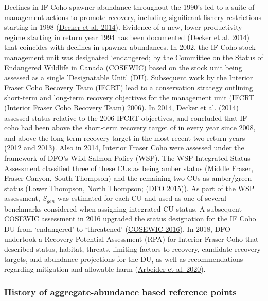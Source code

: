 \documentclass[11pt]{book}
\begin{document}
Declines in IF Coho spawner abundance throughout the 1990's led to a suite of management actions to promote recovery, including significant fishery restrictions starting in 1998 (\protect\hyperlink{ref-deckerAssessmentInteriorFraser2014}{Decker et al. 2014}). Evidence of a new, lower productivity regime starting in return year 1994 has been documented (\protect\hyperlink{ref-deckerAssessmentInteriorFraser2014}{Decker et al. 2014}) that coincides with declines in spawner abundances. In 2002, the IF Coho stock management unit was designated `endangered; by the Committee on the Status of Endangered Wildlife in Canada (COSEWIC) based on the stock unit being assessed as a single 'Designatable Unit' (DU). Subsequent work by the Interior Fraser Coho Recovery Team (IFCRT) lead to a conservation strategy outlining short-term and long-term recovery objectives for the management unit (\protect\hyperlink{ref-ifcrtinteriorfrasercohorecoveryteamConservationStrategyCoho2006}{IFCRT (Interior Fraser Coho Recovery Team) 2006}). In 2014, \protect\hyperlink{ref-deckerAssessmentInteriorFraser2014}{Decker et al.} (\protect\hyperlink{ref-deckerAssessmentInteriorFraser2014}{2014}) assessed status relative to the 2006 IFCRT objectives, and concluded that IF coho had been above the short-term recovery target of in every year since 2008, and above the long-term recovery target in the most recent two return years (2012 and 2013). Also in 2014, Interior Fraser Coho were assessed under the framework of DFO's Wild Salmon Policy (WSP). The WSP Integrated Status Assessment classified three of these CUs as being amber status (Middle Fraser, Fraser Canyon, South Thompson) and the remaining two CUs as amber/green status (Lower Thompson, North Thompson; (\protect\hyperlink{ref-dfoWildSalmonPolicy2015}{DFO 2015})). As part of the WSP assessment, \(S_{gen}\) was estimated for each CU and used as one of several benchmarks considered when assigning integrated CU status. A subsequent COSEWIC assessment in 2016 upgraded the status designation for the IF Coho DU from `endangered' to `threatened' (\protect\hyperlink{ref-cosewicCOSEWICAssessmentStatus2016}{COSEWIC 2016}). In 2018, DFO undertook a Recovery Potential Assessment (RPA) for Interior Fraser Coho that described status, habitat, threats, limiting factors to recovery, candidate recovery targets, and abundance projections for the DU, as well as recommendations regarding mitigation and allowable harm (\protect\hyperlink{ref-arbeiderInteriorFraserCoho2020}{Arbeider et al. 2020}).

\hypertarget{history-of-aggregate-abundance-based-reference-points}{%
\subsubsection{History of aggregate-abundance based reference points}\label{history-of-aggregate-abundance-based-reference-points}}
\end{document}
